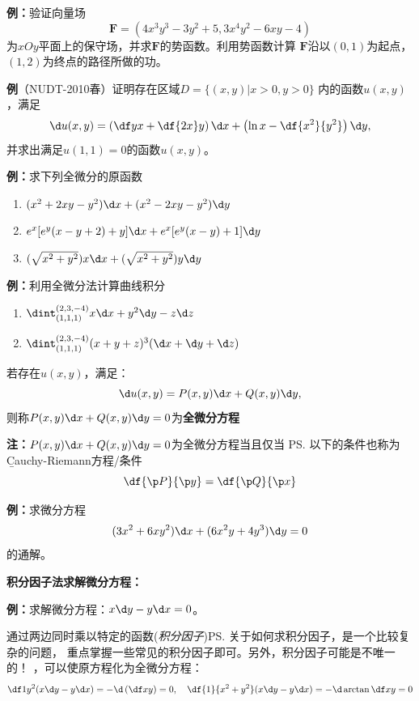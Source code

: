 {\bf 例：}验证向量场
$$\bm{F}=(4x^3y^3-3y^2+5,3x^4y^2-6xy-4)$$
为$xOy$平面上的保守场，并求$\bm{F}$的势函数。利用势函数计算
$\bm{F}$沿以$(0,1)$为起点，$(1,2)$为终点的路径所做的功。

{\bf 例}（NUDT-2010春）证明存在区域$D=\{(x,y)|x>0,y>0\}$
内的函数$u(x,y)$，满足
$$\d u(x,y)=\left(\df yx+\df{2x}y\right)\d x
+\left(\ln x-\df{x^2}{y^2}\right)\d y,$$
并求出满足$u(1,1)=0$的函数$u(x,y)$。

{\bf 例：}求下列全微分的原函数
\begin{enumerate}[(1)]
  \setlength{\itemindent}{1cm}
  \item $(x^2+2xy-y^2)\d x+(x^2-2xy-y^2)\d y$
  \item $e^x[e^y(x-y+2)+y]\d x+e^x[e^y(x-y)+1]\d y$
  \item $(\sqrt{x^2+y^2})x\d x+(\sqrt{x^2+y^2})y\d y$
\end{enumerate}

{\bf 例：}利用全微分法计算曲线积分
\begin{enumerate}[(1)]
  \setlength{\itemindent}{1cm}
  \item $\dint_{(1,1,1)}^{(2,3,-4)}x\d x+y^2\d y-z\d z$
  \item $\dint_{(1,1,1)}^{(2,3,-4)}(x+y+z)^3(\d x+\d y+\d z)$
\end{enumerate}

\begin{thx}
	若存在$u(x,y)$，满足：
	$$\d u(x,y)=P(x,y)\d x+Q(x,y)\d y,$$
	则称$P(x,y)\d x+Q(x,y)\d y=0$为{\bf 全微分方程}
\end{thx}

{\bf 注：}$P(x,y)\d x+Q(x,y)\d y=0$为全微分方程当且仅当
\ps{以下的条件也称为{\b Cauchy-Riemann方程/条件}}
$$\df{\p P}{\p y}=\df{\p Q}{\p x}$$

{\bf 例：}求微分方程
$$(3x^2+6xy^2)\d x+(6x^2y+4y^3)\d y=0$$
的通解。

{\bf 积分因子法求解微分方程：}

{\bf 例：}求解微分方程：$x\d y-y\d x=0$。

通过两边同时乘以特定的函数({\it 积分因子})\ps{关于如何求积分因子，是一个比较复杂的问题，
重点掌握一些常见的积分因子即可。另外，积分因子可能是不唯一的！}
，可以使原方程化为全微分方程：
$${\df 1{y^2}}(x\d y-y\d x) =-\d\left(\df xy\right)
=0,\quad {\df{1}{x^2+y^2}}(x\d y-y\d x) =-\d\arctan\df xy=0$$

